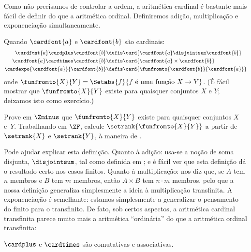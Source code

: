 \documentclass[../../../include/open-logic-section]{subfiles}
\begin{document}

Como não precisamos de controlar a ordem, a aritmética cardinal é
bastante mais fácil de definir do que a aritmética ordinal. Definiremos
adição, multiplicação e exponenciação simultaneamente. 

\begin{defn}
Quando $\cardfont{a}$ e $\cardfont{b}$ são cardinais:
\begin{align*}
	\cardfont{a} \cardplus \cardfont{b} &\defis 
	\card{\cardfont{a} \disjointsum \cardfont{b}}\\
	\cardfont{a} \cardtimes \cardfont{b} &\defis 
	\card{\cardfont{a} \times \cardfont{b}}\\
	\cardexpo{\cardfont{a}}{\cardfont{b}} &\defis 
	\card{\funfromto{\cardfont{b}}{\cardfont{a}}}
\end{align*}
onde $\funfromto{X}{Y} = \Setabs{f}{f \text{ é uma função } X \to Y}$.
(É fácil mostrar que $\funfromto{X}{Y}$ existe para quaisquer conjuntos $X$
e $Y$; deixamos isto como exercício.) 
\end{defn}

\begin{prob}
Prove em $\Zminus$ que $\funfromto{X}{Y}$ existe para quaisquer conjuntos $X$
e~$Y$. Trabalhando em $\ZF$, calcule $\setrank{\funfromto{X}{Y}}$ a partir de
$\setrank{X}$ e $\setrank{Y}$, à maneira de
. 
\end{prob}

Pode ajudar explicar esta definição. Quanto à adição: usa-se a noção de soma disjunta, $\disjointsum$, tal como definida em
; e é fácil
ver que esta definição dá o resultado certo nos casos finitos.
Quanto à multiplicação:  nos diz
que, se $A$ tem $n$ membros e $B$ tem $m$ membros, então $A \times B$
tem $n \cdot m$ membros, pelo que a nossa definição generaliza simplesmente a ideia
à multiplicação transfinita. A exponenciação é semelhante: estamos
simplesmente a generalizar o pensamento do finito para o transfinito.
De fato, sob certos aspectos, a aritmética cardinal transfinita parece muito
mais a aritmética ``ordinária'' do que a aritmética ordinal
transfinita:

\begin{prop}
$\cardplus$ e $\cardtimes$ são comutativas e associativas. 
\end{prop}
\end{document}
